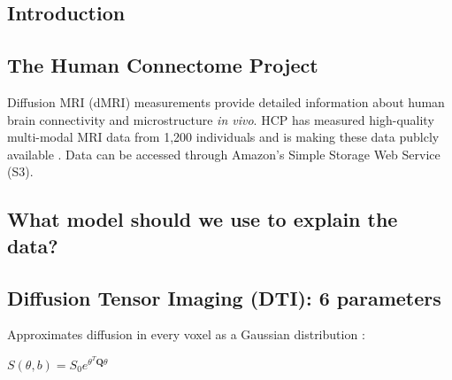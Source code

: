 \documentclass[a0, landscape]{a0poster}
\begin{document}
\vspace{0.5cm} %


\begin{multicols}{3} %


\section*{Introduction}

\subsection*{The Human Connectome Project}

Diffusion MRI (dMRI) measurements provide detailed information about human brain
connectivity and microstructure \emph{in vivo}. HCP has measured high-quality
multi-modal MRI data from 1,200 individuals and is making these data publcly
available \cite{glasser2016}. Data can be accessed through Amazon's Simple
Storage Web Service (S3).

\subsection*{What model should we use to explain the data?}

\subsection*{Diffusion Tensor Imaging (DTI): 6 parameters}

Approximates diffusion in every voxel as a Gaussian distribution
\cite{Basser1994-hg}:

\vspace{2mm}
\begin{center}
\begin{large}

$S(\theta, b) = S_0 e^{\theta^T \mathbf{Q} \theta} $

\end{large}
\end{center}


\end{multicols}
\end{document}
